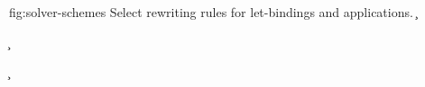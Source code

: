 \documentclass[acmsmall,screen,nonacm,review]{acmart}
\begin{document}
\begin{mathparfig}[htpb!]
  {fig:solver-schemes}
  {Select rewriting rules for let-bindings and applications.}
    {\cletr \x \tv \tvs \c {\C\where{\cexistsi {\tvc, \inst} \x {\cunif \tvc \t \cand \cpinst \inst \tv \tvc}}}}

    {\cletr \x \tv \tvs {\c}
      \C{}}

    {\cpinst \inst \tv \tvca \cand \cunif \tvca \tvcb}

    {\cletr \x \tv \tvs {\ueqs \cand \c} {\C\where\ctrue}}

    {\cletr \x \tv \tvs \c {\C\where{\cunif \tvb \tvc}}}

    {\c}

  \rewrite[S-Compress]
    {\cletr \x \tv {\tvs, \tvb} {\ca \cand \cunif \tvb {\cunif \tvc \ueq}} {\cb} }
    {\cletr \x \tv {\tvs, \tvb} {\ca\where{\tvb \is \tvc} \cand \cunif \tvc {\ueq\where{\tvc \is \tvc}}} {\cb{}}}


\end{mathparfig}
\end{document}
